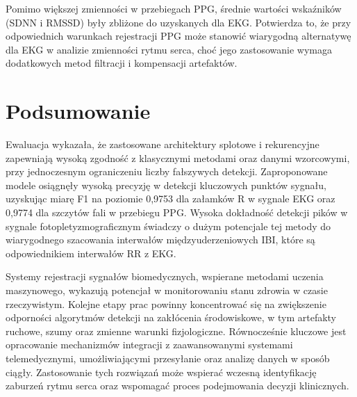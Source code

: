 \documentclass[journal]{IEEEtran}
\begin{document}
{Pomimo większej zmienności w przebiegach PPG, średnie wartości wskaźników (SDNN i RMSSD) były zbliżone do uzyskanych dla EKG. Potwierdza to, że przy odpowiednich warunkach rejestracji PPG może stanowić wiarygodną alternatywę dla EKG w analizie zmienności rytmu serca, choć jego zastosowanie wymaga dodatkowych metod filtracji i kompensacji artefaktów.


\section{Podsumowanie}
Ewaluacja wykazała, że zastosowane architektury splotowe i rekurencyjne zapewniają wysoką zgodność z klasycznymi metodami oraz danymi wzorcowymi, przy jednoczesnym ograniczeniu liczby fałszywych detekcji. %
Zaproponowane modele osiągnęły wysoką precyzję w detekcji kluczowych punktów sygnału, uzyskując miarę F1 na poziomie 0,9753 dla załamków R w sygnale EKG oraz 0,9774 dla szczytów fali w przebiegu PPG.
Wysoka dokładność detekcji pików w sygnale fotopletyzmograficznym świadczy o dużym potencjale tej metody do wiarygodnego szacowania interwałów międzyuderzeniowych IBI, które są odpowiednikiem interwałów RR z EKG.

Systemy rejestracji sygnałów biomedycznych, wspierane metodami uczenia maszynowego, wykazują potencjał w monitorowaniu stanu zdrowia w czasie rzeczywistym. Kolejne etapy prac powinny koncentrować się na zwiększenie odporności algorytmów detekcji na zakłócenia środowiskowe, w tym artefakty ruchowe, szumy oraz zmienne warunki fizjologiczne. Równocześnie kluczowe jest opracowanie mechanizmów integracji z zaawansowanymi systemami telemedycznymi, umożliwiającymi przesyłanie oraz analizę danych w sposób ciągły. Zastosowanie tych rozwiązań może wspierać wczesną identyfikację zaburzeń rytmu serca oraz wspomagać proces podejmowania decyzji klinicznych.

}
\end{document}
